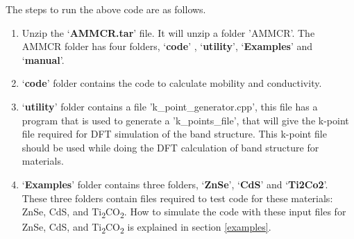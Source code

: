 \documentclass[12pt]{article}
\begin{document}
The steps to run the above code are as follows.

\begin{enumerate}

\item Unzip the \lq \textbf{AMMCR.tar}\rq \hspace{0.5mm} file. It will unzip a folder 'AMMCR'. The AMMCR folder has four folders, \lq \textbf{code}\rq \hspace{0.5mm} , \lq \textbf{utility}\rq \hspace{0.5mm}, \lq \textbf{Examples}\rq \hspace{0.5mm} and \lq \textbf{manual}\rq \hspace{0.5mm}.

\item \lq \textbf{code}\rq \hspace{0.5mm} folder contains the code to calculate mobility and conductivity. 

\item \lq \textbf{utility}\rq \hspace{0.5mm} folder contains a file 'k\_point\_generator.cpp', this file has a program that is used to generate a 'k\_points\_file', that will give the k-point file required for DFT simulation of the band structure. This k-point file should be used while doing the DFT calculation of band structure for materials.   

\item \lq \textbf{Examples}\rq \hspace{0.5mm} folder contains three folders, \lq \textbf{ZnSe}\rq, \lq \textbf{CdS}\rq \hspace{0.5mm} and \lq \textbf{Ti2Co2}\rq \hspace{0.5mm}. These three folders contain files required to test code for these materials: ZnSe, CdS, and Ti\textsubscript{2}CO\textsubscript{2}. How to simulate the code with these input files for ZnSe, CdS, and Ti\textsubscript{2}CO\textsubscript{2} is explained in section \ref{examples}.  



\end{enumerate}
\end{document}
